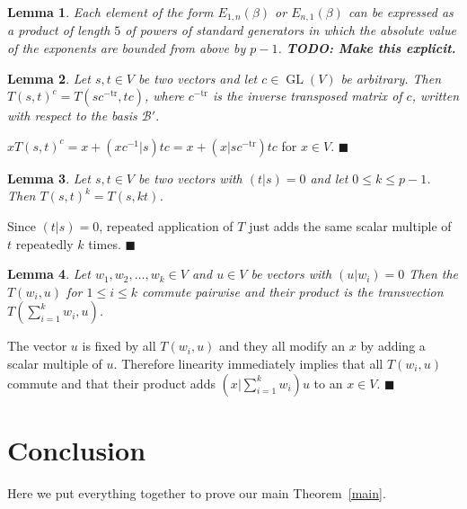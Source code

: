 \documentclass[a4paper,11pt]{article}
\def\GL{\operatorname{GL}}
\newcommand{\fixme}[1]{\textbf{#1}}
\newcommand{\tr}{\mathrm{tr}}
\newcommand{\proofend}{\hfill$\blacksquare$}
\newcommand{\B}{\mathcal{B}}
\newtheorem{lemma}{Lemma}
\begin{document}
\begin{lemma}
\label{transvecs}
Each element of the form $E_{1,n}(\beta)$ or $E_{n,1}(\beta)$ can be
expressed as a product of length $5$ of powers of standard generators
in which the absolute value of the exponents are bounded from above 
by $p-1$. \fixme{TODO: Make this explicit.}
\end{lemma}

\begin{lemma}
\label{conjtransv}
Let $s,t \in V$ be two vectors and let $c \in \GL(V)$ be arbitrary. 
Then $T(s,t)^c = T(sc^{-\tr},tc)$,
where $c^{-\tr}$ is the inverse transposed matrix of $c$, written
with respect to the basis $\B'$.
\end{lemma}
\proof
$xT(s,t)^c = x + (xc^{-1}|s)tc = x + (x|sc^{-\tr})tc$ for $x \in V$. 
\proofend

\begin{lemma}
\label{powertrans}
Let $s,t \in V$ be two vectors with $(t|s)=0$ and let 
$0 \le k \le p-1$. Then $T(s,t)^k = T(s,kt)$.
\end{lemma}
\proof Since $(t|s)=0$, repeated application of $T$ just adds the same
scalar multiple of $t$ repeatedly $k$ times.
\proofend

\begin{lemma}
\label{lincombtrans}
Let $w_1, w_2, \ldots, w_k \in V$ and $u \in V$ be vectors with 
$(u|w_i)=0$
Then the $T(w_i,u)$ for $1 \le i \le k$ commute pairwise and their 
product is the transvection $T(\sum_{i=1}^k w_i,u)$.
\end{lemma}
\proof The vector $u$ is fixed by all $T(w_i,u)$ and they all modify
an $x$ by adding a scalar multiple of $u$. Therefore linearity
immediately implies that all $T(w_i,u)$ commute and that their product adds
$(x|\sum_{i=1}^k w_i)u$ to an $x \in V$.
\proofend

\section{Conclusion}

Here we put everything together to prove our main Theorem~\ref{main}.
\end{document}

